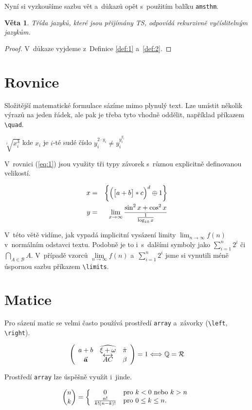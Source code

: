 \documentclass[a4paper, 11pt, twocolumn]{article}[5.3.2020]
\begin{document}
\par Nyní si vyzkoušíme sazbu vět a~důkazů opět s~použitím balíku \verb|amsthm|.

\newtheorem{sentence}{Věta}
\begin{sentence}
    Třída jazyků, které jsou přijímány TS, odpovídá \emph{rekurzivně vyčíslitelným jazykům}.
\end{sentence}

\begin{proof}
    V~důkaze vyjdeme z~Definice \ref{def:1} a~\ref{def:2}.
\end{proof}

\section{Rovnice}
Složitější matematické formulace sázíme mimo plynulý text. Lze umístit několik výrazů na jeden řádek, ale pak je třeba tyto vhodně oddělit, například příkazem \verb|\quad|.
\bigskip
\begin{center}
    $\sqrt[i]{x^3_i}$ \quad kde $x_i$ je $i$-té sudé číslo \quad $y^{2 \cdot y_i}_i \neq y^{y^{y_i}_i}_i$
\end{center}
\par V~rovnici (\ref{eq:1}) jsou využity tři typy závorek s~různou
explicitně definovanou velikostí.

\begin{eqnarray}
    \label{eq:1}x & = & \bigg{\{}\Big{(}\big{[}a+b\big{]}*c\Big{)}^d \oplus 1\bigg{\}} \\
    \label{eq:2}y & = & \lim \limits_{x \to \infty}\frac{\sin^{2}x + \cos^{2}x}{\frac{1}{\log_{10}x}}
\end{eqnarray}

V~této větě vidíme, jak vypadá implicitní vysázení limity $\lim_{n \to \infty} f(n)$ v~normálním odstavci textu. Podobně je to i~s~dalšími symboly jako $\sum^{n}_{i=1} 2^{i}$ či $\bigcap_{A \in \mathcal{B}} A$. V~případě vzorců $\lim \limits_{n \to \infty} f(n)$ a~$\sum \limits^n_{i=1} 2^i$ jsme si vynutili méně úspornou sazbu příkazem \verb|\limits|.

\section{Matice}
Pro sázení matic se velmi často používá prostředí \verb|array| a~závorky (\verb|\left|, \verb|\right|).

\smallskip
$$ \left(
\begin{array}{c c c}
    a+b & \widehat{\xi + \omega} & \hat{\pi} \\
    \vec{\mathbf{a}} & \overleftrightarrow{AC} & \beta
\end{array}
\right) = 1 \Longleftrightarrow {\mathbb Q} = {\mathcal R} $$

\noindent Prostředí \verb|array| lze úspěšně využít i~jinde.

$$ \binom{n}{k} = \left\{
    \begin{array}{c l}
        0 & \text{pro } k < 0 \text{ nebo } k > n \\
       \frac{n!}{k!(n-k)!} & \text{pro } 0 \leq k \leq n.
    \end{array} \right. $$
\end{document}
